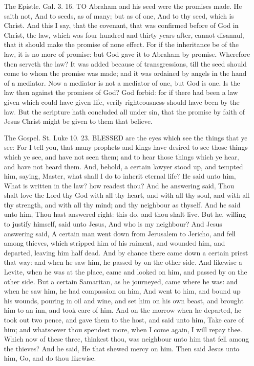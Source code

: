 The Epistle. Gal. 3. 16.
TO Abraham and his seed were the promises made. He saith not, And to seeds, as of many; but as of one, And to thy seed, which is Christ. And this I say, that the covenant, that was confirmed before of God in Christ, the law, which was four hundred and thirty years after, cannot disannul, that it should make the promise of none effect. For if the inheritance be of the law, it is no more of promise: but God gave it to Abraham by promise. Wherefore then serveth the law? It was added because of transgressions, till the seed should come to whom the promise was made; and it was ordained by angels in the hand of a mediator. Now a mediator is not a mediator of one, but God is one. Is the law then against the promises of God? God forbid: for if there had been a law given which could have given life, verily righteousness should have been by the law. But the scripture hath concluded all under sin, that the promise by faith of Jesus Christ might be given to them that believe.


The Gospel. St. Luke 10. 23.
BLESSED are the eyes which see the things that ye see: For I tell you, that many prophets and kings have desired to see those things which ye see, and have not seen them; and to hear those things which ye hear, and have not heard them. And, behold, a certain lawyer stood up, and tempted him, saying, Master, what shall I do to inherit eternal life? He said unto him, What is written in the law? how readest thou? And he answering said, Thou shalt love the Lord thy God with all thy heart, and with all thy soul, and with all thy strength, and with all thy mind; and thy neighbour as thyself. And he said unto him, Thou hast answered right: this do, and thou shalt live. But he, willing to justify himself, said unto Jesus, And who is my neighbour? And Jesus answering said, A certain man went down from Jerusalem to Jericho, and fell among thieves, which stripped him of his raiment, and wounded him, and departed, leaving him half dead. And by chance there came down a certain priest that way: and when he saw him, he passed by on the other side. And likewise a Levite, when he was at the place, came and looked on him, and passed by on the other side. But a certain Samaritan, as he journeyed, came where he was: and when he saw him, he had compassion on him, And went to him, and bound up his wounds, pouring in oil and wine, and set him on his own beast, and brought him to an inn, and took care of him. And on the morrow when he departed, he took out two pence, and gave them to the host, and said unto him, Take care of him; and whatsoever thou spendest more, when I come again, I will repay thee. Which now of these three, thinkest thou, was neighbour unto him that fell among the thieves? And he said, He that shewed mercy on him. Then said Jesus unto him, Go, and do thou likewise.


